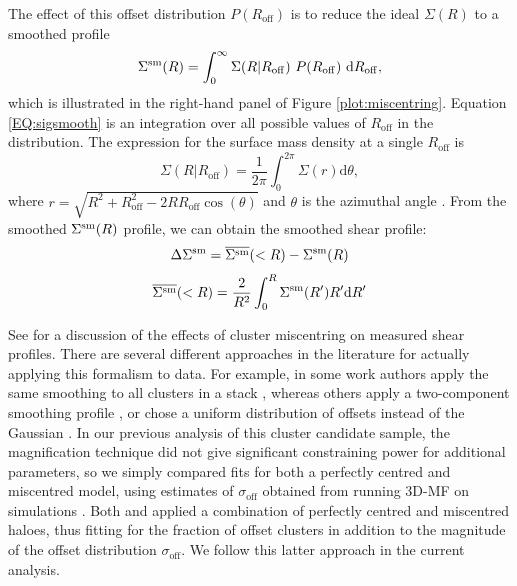 The effect of this offset distribution $P(R_{\mathrm{off}})$ is to reduce the ideal $\Sigma(R)$ to a smoothed profile \citep[see e.g.][]{Johnston07,George12}
\begin{equation}
\label{EQ:sigsmooth}
\Sigma^{\rm sm}(R)=\int_{0}^{\infty} \Sigma(R|R_{\mathrm{off}})\ P(R_{\mathrm{off}})\ \mathrm{d}R_{\mathrm{off}},
\end{equation}
which is illustrated in the right-hand panel of Figure \ref{plot:miscentring}. Equation \ref{EQ:sigsmooth} is an integration over all possible values of $R_{\mathrm{off}}$ in the distribution. The expression for the surface mass density at a single $R_{\mathrm{off}}$ is
\begin{equation}
\Sigma(R|R_{\mathrm{off}})=\frac{1}{2\pi}\int_{0}^{2\pi}\Sigma(r) \mathrm{d}\theta,
\end{equation}
where $r = \sqrt{R^2+R_{\mathrm{off}}^2-2RR_{\mathrm{off}}\cos(\theta)}$ and $\theta$ is the azimuthal angle \citep{Yang06}. From the smoothed $\Sigma^{\rm sm}(R)$ profile, we can obtain the smoothed shear profile:
\begin{equation}
\Delta\Sigma^{\rm sm} = \overline{\Sigma^{\rm sm}}(<R) - \Sigma^{\rm sm}(R)
\end{equation}
\begin{equation}
\overline{\Sigma^{\rm sm}}(<R) = \frac{2}{R^2} \int_{0}^{R} \Sigma^{\rm sm}(R')R'\mathrm{d}R'
\end{equation}

See \citet{George12} for a discussion of the effects of cluster miscentring on measured shear profiles. There are several different approaches in the literature for actually applying this formalism to data. For example, in some work authors apply the same smoothing to all clusters in a stack \citep{George12}, whereas others apply a two-component smoothing profile \citep{Oguri14}, or chose a uniform distribution of offsets instead of the Gaussian \citep{Sehgal13}. In our previous analysis of this cluster candidate sample, the magnification technique did not give significant constraining power for additional parameters, so we simply compared fits for both a perfectly centred and miscentred model, using estimates of $\sigma_{\mathrm{off}}$ obtained from running \ac{3D-MF} on simulations \citep{Ford14}. Both \citet{Johnston07} and \citet{Covone14} applied a combination of perfectly centred and miscentred haloes, thus fitting for the fraction of offset clusters in addition to the magnitude of the offset distribution $\sigma_{\mathrm{off}}$. We follow this latter approach in the current analysis.

